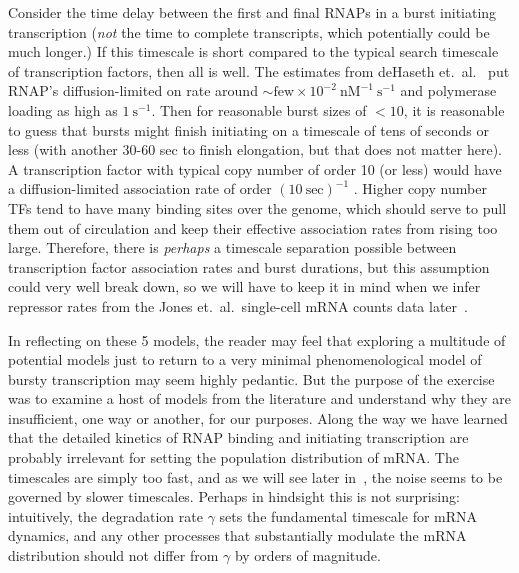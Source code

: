 Consider the time delay between the first and final RNAPs in a burst initiating
transcription (\textit{not} the time to complete transcripts, which potentially
could be much longer.) If this timescale is short compared to the typical search
timescale of transcription factors, then all is well. The estimates from
deHaseth et.\ al.~\cite{DeHaseth1998} put RNAP's diffusion-limited on rate
around $\sim\text{few}\times10^{-2}~\text{nM}^{-1}~\text{s}^{-1}$ and polymerase
loading as high as $1~\text{s}^{-1}$. Then for reasonable burst sizes of $<10$,
it is reasonable to guess that bursts might finish initiating on a timescale of
tens of seconds or less (with another 30-60 sec to finish elongation, but that
does not matter here). A transcription factor with typical copy number of order
10 (or less) would have a diffusion-limited association rate of order
$(10~\text{sec})^{-1}$ \cite{Hammar2014}. Higher copy number TFs tend to have
many binding sites over the genome, which should serve to pull them out of
circulation and keep their effective association rates from rising too large.
Therefore, there is \textit{perhaps} a timescale separation possible between
transcription factor association rates and burst durations, but this assumption
could very well break down, so we will have to keep it in mind when we infer
repressor rates from the Jones et.\ al.\ single-cell mRNA counts data
later~\cite{Jones2014}.

In reflecting on these 5 models, the reader may feel that exploring a multitude
of potential models just to return to a very minimal phenomenological model of
bursty transcription may seem highly pedantic. But the purpose of the exercise
was to examine a host of models from the literature and understand why they are
insufficient, one way or another, for our purposes. Along the way we have
learned that the detailed kinetics of RNAP binding and initiating transcription
are probably irrelevant for setting the population distribution of mRNA. The
timescales are simply too fast, and as we will see later
in~, the noise seems to be governed by slower timescales.
Perhaps in hindsight this is not surprising: intuitively, the degradation rate
$\gamma$ sets the fundamental timescale for mRNA dynamics, and any other
processes that substantially modulate the mRNA distribution should not differ
from $\gamma$ by orders of magnitude.
